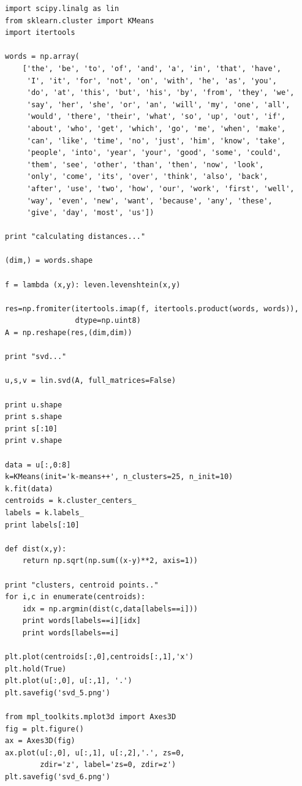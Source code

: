 \documentclass[12pt,fleqn]{article}\usepackage{../../common}
\begin{document}
\begin{verbatim}
import scipy.linalg as lin
from sklearn.cluster import KMeans
import itertools

words = np.array(
    ['the', 'be', 'to', 'of', 'and', 'a', 'in', 'that', 'have',
     'I', 'it', 'for', 'not', 'on', 'with', 'he', 'as', 'you',
     'do', 'at', 'this', 'but', 'his', 'by', 'from', 'they', 'we',
     'say', 'her', 'she', 'or', 'an', 'will', 'my', 'one', 'all',
     'would', 'there', 'their', 'what', 'so', 'up', 'out', 'if',
     'about', 'who', 'get', 'which', 'go', 'me', 'when', 'make',
     'can', 'like', 'time', 'no', 'just', 'him', 'know', 'take',
     'people', 'into', 'year', 'your', 'good', 'some', 'could',
     'them', 'see', 'other', 'than', 'then', 'now', 'look',
     'only', 'come', 'its', 'over', 'think', 'also', 'back',
     'after', 'use', 'two', 'how', 'our', 'work', 'first', 'well',
     'way', 'even', 'new', 'want', 'because', 'any', 'these',
     'give', 'day', 'most', 'us'])

print "calculating distances..."

(dim,) = words.shape

f = lambda (x,y): leven.levenshtein(x,y)

res=np.fromiter(itertools.imap(f, itertools.product(words, words)),
                dtype=np.uint8)
A = np.reshape(res,(dim,dim))

print "svd..."

u,s,v = lin.svd(A, full_matrices=False)

print u.shape
print s.shape
print s[:10]
print v.shape

data = u[:,0:8]
k=KMeans(init='k-means++', n_clusters=25, n_init=10)
k.fit(data)
centroids = k.cluster_centers_
labels = k.labels_
print labels[:10]

def dist(x,y):   
    return np.sqrt(np.sum((x-y)**2, axis=1))
    
print "clusters, centroid points.."
for i,c in enumerate(centroids):
    idx = np.argmin(dist(c,data[labels==i]))
    print words[labels==i][idx]
    print words[labels==i]
    
plt.plot(centroids[:,0],centroids[:,1],'x')
plt.hold(True)
plt.plot(u[:,0], u[:,1], '.')
plt.savefig('svd_5.png')

from mpl_toolkits.mplot3d import Axes3D
fig = plt.figure()
ax = Axes3D(fig)
ax.plot(u[:,0], u[:,1], u[:,2],'.', zs=0,
        zdir='z', label='zs=0, zdir=z')
plt.savefig('svd_6.png')
\end{verbatim}
\end{document}
